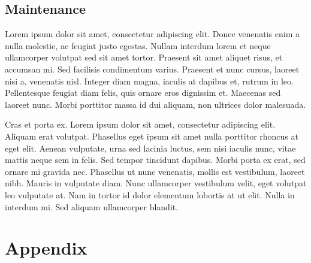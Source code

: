 \documentclass[12pt, a4paper, oneside]{book}
\begin{document}
\begin{spacing}{1.5}
\section{Maintenance}


Lorem ipsum dolor sit amet, consectetur adipiscing elit. Donec venenatis enim a nulla molestie, ac feugiat justo egestas. Nullam interdum lorem et neque ullamcorper volutpat sed sit amet tortor. Praesent sit amet aliquet risus, et accumsan mi. Sed facilisis condimentum varius. Praesent et nunc cursus, laoreet nisi a, venenatis nisl. Integer diam magna, iaculis at dapibus et, rutrum in leo. Pellentesque feugiat diam felis, quis ornare eros dignissim et. Maecenas sed laoreet nunc. Morbi porttitor massa id dui aliquam, non ultrices dolor malesuada.

Cras et porta ex. Lorem ipsum dolor sit amet, consectetur adipiscing elit. Aliquam erat volutpat. Phasellus eget ipsum sit amet nulla porttitor rhoncus at eget elit. Aenean vulputate, urna sed lacinia luctus, sem nisi iaculis nunc, vitae mattis neque sem in felis. Sed tempor tincidunt dapibus. Morbi porta ex erat, sed ornare mi gravida nec. Phasellus ut nunc venenatis, mollis est vestibulum, laoreet nibh. Mauris in vulputate diam. Nunc ullamcorper vestibulum velit, eget volutpat leo vulputate at. Nam in tortor id dolor elementum lobortis at ut elit. Nulla in interdum mi. Sed aliquam ullamcorper blandit.
\end{spacing}

\chapter{Appendix}
\end{document}
